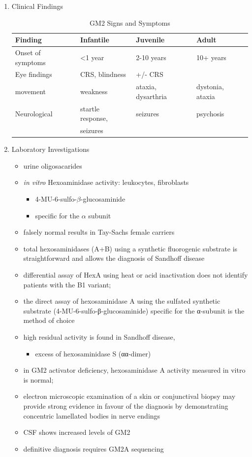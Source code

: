 \documentclass{scrartcl}
\begin{document}
\begin{enumerate}
\item Clinical Findings
\label{sec:org36032d3}
\begin{table}[htbp]
\caption{\label{tab:org70bc8e6}
GM2 Signs and Symptoms}
\centering
\begin{tabular}{llll}
Finding & Infantile & Juvenile & Adult\\
\hline
Onset of symptoms & <1 year & 2-10 years & 10+ years\\
Eye findings & CRS, blindness & +/- CRS & \\
movement & weakness & ataxia, dysarthria & dystonia, ataxia\\
Neurological & startle response, & seizures & psychosis\\
 & seizures &  & \\
\end{tabular}
\end{table}

\item Laboratory Investigations
\label{sec:org6d99d3a}
\begin{itemize}
\item urine oligosacarides
\item \emph{in vitro} Hexoaminidase activity: leukocytes, fibroblasts
\begin{itemize}
\item 4-MU-6-sulfo-\(\beta\)-glucosaminide
\item specific for the \(\alpha\) subunit
\end{itemize}
\item falsely normal results in Tay-Sachs female carriers
\item total hexosaminidases (A+B) using a synthetic fluorogenic substrate
is straightforward and allows the diagnosis of Sandhoff disease
\item differential assay of HexA using heat or acid
inactivation does not identify patients with the B1 variant;
\item the direct assay of hexosaminidase A using the sulfated synthetic
substrate (4-MU-6-sulfo-β-glucosaminide) specific for the α-subunit
is the method of choice
\item high residual activity is found in Sandhoff disease,
\begin{itemize}
\item excess of hexosaminidase S (αα-dimer)
\end{itemize}
\item in GM2 activator deficiency, hexosaminidase A activity measured in
vitro is normal;
\item electron microscopic examination of a skin or conjunctival biopsy
may provide strong evidence in favour of the diagnosis by
demonstrating concentric lamellated bodies in nerve endings
\item CSF shows increased levels of GM2
\item definitive diagnosis requires GM2A sequencing
\end{itemize}


\end{enumerate}
\end{document}
